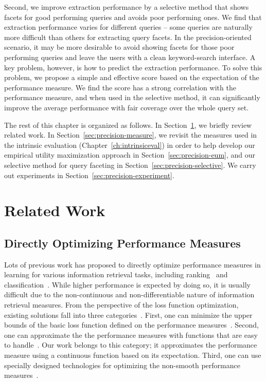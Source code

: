 Second, we improve extraction performance by a selective method that shows facets for good performing queries and avoids poor performing ones. We find that extraction performance varies for different queries -- some queries are naturally more difficult than others for extracting query facets. In the precision-oriented scenario, it may be more desirable to avoid showing facets for those poor performing queries and leave the users with a clean keyword-search interface. A key problem, however, is how to predict the extraction performance. To solve this problem, we propose a simple and effective score based on the expectation of the performance measure. We find the score has a strong correlation with the performance measure, and when used in the selective method, it can significantly improve the average performance with fair coverage over the whole query set.

The rest of this chapter is organized as follows. In Section~\ref{sec:precision-related}, we briefly review related work. In Section~\ref{sec:precision-measure}, we revisit the \PRF measures used in the intrinsic evaluation (Chapter~\ref{ch:intrinsiceval}) in order to help develop our empirical utility maximization approach in Section~\ref{sec:precision-eum}, and our selective method for query faceting in Section~\ref{sec:precision-selective}. We carry out experiments in Section~\ref{sec:precision-experiment}.
\section{Related Work}
\label{sec:precision-related}
\subsection{Directly Optimizing Performance Measures}
Lots of previous work has proposed to directly optimize performance measures in learning for various information retrieval tasks, including ranking~\cite{metzler2005direct,xu2008directly,xu2007adarank,cossock2006subset,quoc2007learning,de2007combined} and classification~\cite{musicant2003optimizing,joachims2005support,jansche2005maximum}. While higher performance is expected by doing so, it is usually difficult due to the non-continuous and non-differentiable nature of information retrieval measures. From the perspective of the loss function optimization, existing solutions fall into three categories~\cite{xu2008directly}. First, one can minimize the upper bounds of the basic loss function defined on the performance measures~\cite{xu2007adarank,joachims2005support,yue2007support}. Second, one can approximate the the performance measures with functions that are easy to handle~\cite{jansche2005maximum,cossock2006subset}. Our work belongs to this category; it approximates the performance measure using a continuous function based on 
its expectation. Third, one can use specially designed technologies for optimizing the non-smooth performance measures~\cite{quoc2007learning,de2007combined}. 

